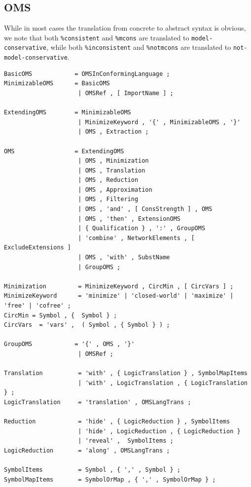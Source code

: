 \documentclass[10pt,fleqn,%
\ifpretendfinal
final%
\else
draft%
\fi,
]{scrreprt}
\newcommand*{\syntax}[1]{\texttt{#1}}
\newcommand{\ssclause}[1]{\subsection{#1}}
\begin{document}
\vspace{1em}

\ssclause{OMS}\label{a:dol-text:OMS}

While in most cases the translation from concrete to abstract syntax
is obvious, we note that both \syntax{\%consistent} and
\syntax{\%mcons} are translated to \syntax{model-conservative}, while
both \syntax{\%inconsistent} and \syntax{\%notmcons} are translated to
\syntax{not-model-conservative}.
                       
                       
\begin{lstlisting}[language=ebnf,escapeinside={<>},mathescape]
BasicOMS            = OMSInConformingLanguage ;
MinimizableOMS      = BasicOMS
                     | OMSRef , [ ImportName ] ; 
                     
ExtendingOMS        = MinimizableOMS
                     | MinimizeKeyword , '{' , MinimizableOMS , '}' 
                     | OMS , Extraction ;
                     
OMS                 = ExtendingOMS
                     | OMS , Minimization 
                     | OMS , Translation
                     | OMS , Reduction
                     | OMS , Approximation
                     | OMS , Filtering
                     | OMS , 'and' , [ ConsStrength ] , OMS 
                     | OMS , 'then' , ExtensionOMS
                     | { Qualification } , ':' , GroupOMS
                     | 'combine' , NetworkElements , [ ExcludeExtensions ]  
                     | OMS , 'with' , SubstName
                     | GroupOMS ;

Minimization         = MinimizeKeyword , CircMin , [ CircVars ] ;
MinimizeKeyword      = 'minimize' | 'closed-world' | 'maximize' | 'free' | 'cofree' ;
CircMin = Symbol , {  Symbol } ;
CircVars  = 'vars' ,  ( Symbol , { Symbol } ) ;

GroupOMS            = '{' , OMS , '}'
                     | OMSRef ;

Translation          = 'with' , { LogicTranslation } , SymbolMapItems
                     | 'with' , LogicTranslation , { LogicTranslation } ;
LogicTranslation     = 'translation' , OMSLangTrans ;
                      
Reduction            = 'hide' , { LogicReduction } , SymbolItems 
                     | 'hide' , LogicReduction , { LogicReduction } 
                     | 'reveal' ,  SymbolItems ;
LogicReduction       = 'along' , OMSLangTrans ;

SymbolItems          = Symbol , { ',' , Symbol } ;
SymbolMapItems       = SymbolOrMap , { ',' , SymbolOrMap } ;


\end{lstlisting}
\end{document}
